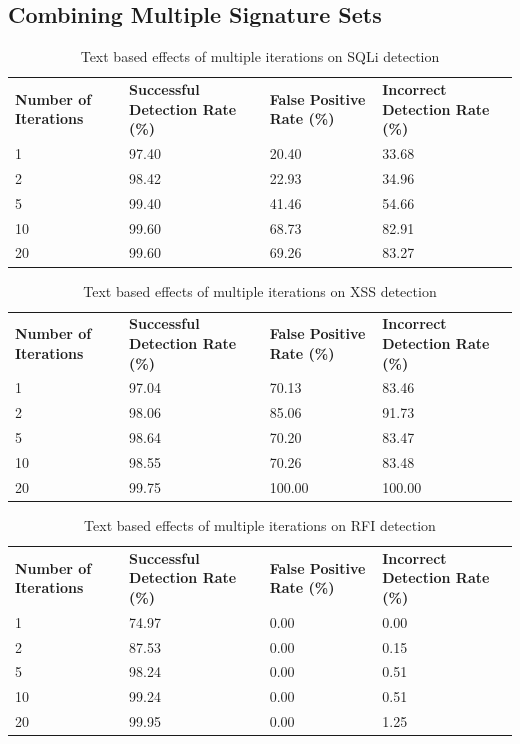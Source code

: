 \begin{appendices}
\newpage
\subsection{Combining Multiple Signature Sets}

\begin{table}[h]
	\centering
	\begin{tabular}{|p{1.5in}|p{1in}|p{1in}|p{1in}|}
	\hline
	\textbf{Number of Iterations} & \textbf{Successful Detection Rate (\%)} & \textbf{False Positive Rate (\%)} & \textbf{Incorrect Detection Rate (\%)}  \\
	\hhline{|=|=|=|=|}
	1 & 97.40 & 20.40 & 33.68 \\
	\hline
	2 & 98.42 & 22.93 & 34.96 \\
	\hline
	5 & 99.40 & 41.46 & 54.66 \\
	\hline
	10 & 99.60 & 68.73 & 82.91 \\
	\hline
	20 & 99.60 & 69.26 & 83.27 \\
	\hline
	\end{tabular}
	\caption{Text based effects of multiple iterations on SQLi detection}
\end{table}

\begin{table}[h]
	\centering
	\begin{tabular}{|p{1.5in}|p{1in}|p{1in}|p{1in}|}
	\hline
	\textbf{Number of Iterations} & \textbf{Successful Detection Rate (\%)} & \textbf{False Positive Rate (\%)} & \textbf{Incorrect Detection Rate (\%)}  \\
	\hhline{|=|=|=|=|}
	1 & 97.04 & 70.13 & 83.46 \\
	\hline
	2 & 98.06 & 85.06 & 91.73 \\
	\hline
	5 & 98.64 & 70.20 & 83.47 \\
	\hline
	10 & 98.55 & 70.26 & 83.48 \\
	\hline
	20 & 99.75 & 100.00 & 100.00 \\
	\hline
	\end{tabular}
	\caption{Text based effects of multiple iterations on XSS detection}
\end{table}

\begin{table}[h]
	\centering
	\begin{tabular}{|p{1.5in}|p{1in}|p{1in}|p{1in}|}
	\hline
	\textbf{Number of Iterations} & \textbf{Successful Detection Rate (\%)} & \textbf{False Positive Rate (\%)} & \textbf{Incorrect Detection Rate (\%)}  \\
	\hhline{|=|=|=|=|}
	1 & 74.97 & 0.00 & 0.00 \\
	\hline
	2 & 87.53 & 0.00 & 0.15 \\
	\hline
	5 & 98.24 & 0.00 & 0.51 \\
	\hline
	10 & 99.24 & 0.00 & 0.51 \\
	\hline
	20 & 99.95 & 0.00 & 1.25 \\
	\hline
	\end{tabular}
	\caption{Text based effects of multiple iterations on RFI detection}
\end{table}


\end{appendices}
